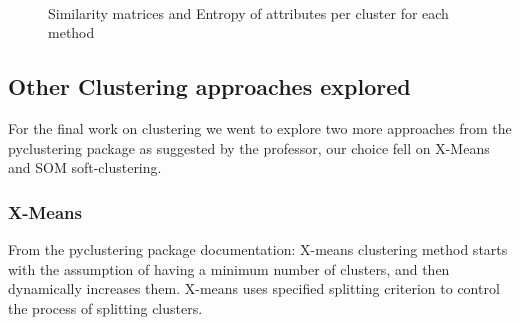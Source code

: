 \begin{figure}[H]
    \\
    \caption{Similarity matrices and Entropy of attributes per cluster for each method}
    \label{fig:val_clusters}
\end{figure}

\subsection{Other Clustering approaches explored}
For the final work on clustering we went to explore two more approaches from the pyclustering package as suggested by the professor, our choice fell on X-Means and SOM soft-clustering.
\subsubsection{X-Means}
From the pyclustering package documentation: X-means clustering method starts with the assumption of having a minimum number of clusters, and then dynamically increases them. X-means uses specified splitting criterion to control the process of splitting clusters.
\vspace{3mm}

